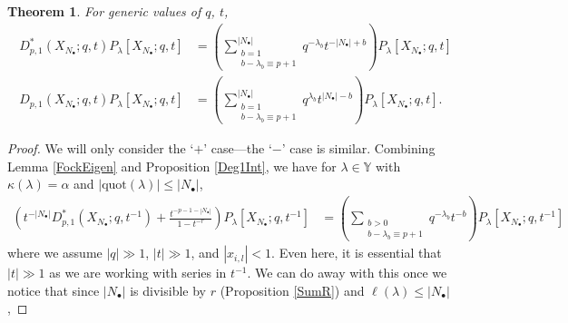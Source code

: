 \documentclass{amsart}
\newcommand{\kb}{\kappa}
\newtheorem{thm}{Theorem}
\theoremstyle{remark}
\numberwithin{thm}{section}
\numberwithin{equation}{section}
\begin{document}
\begin{thm}\label{Deg1Thm}
For generic values of $q$, $t$,
\begin{align}
\label{EigenF1}D_{p,1}^*\left( X_{N_\bullet};q,t \right)P_\lambda[X_{N_\bullet};q,t]
&=\left(\sum_{\substack{b=1\\ b-\lambda_b\equiv p+1}}^{|N_\bullet|}
q^{-\lambda_b}t^{-|N_\bullet|+b}\right)
P_\lambda[X_{N_\bullet};q,t]\\
\label{EigenE1}D_{p,1}\left( X_{N_\bullet};q,t \right)P_\lambda[X_{N_\bullet};q,t]
&=\left(\sum_{\substack{b=1\\ b-\lambda_b\equiv p+1}}^{|N_\bullet|}
q^{\lambda_b}t^{|N_\bullet|-b}\right)
P_\lambda[X_{N_\bullet};q,t].
\end{align}
\end{thm}
\begin{proof}
%
We will only consider the `$+$' case---the `$-$' case is similar.
Combining Lemma \ref{FockEigen} and Proposition \ref{Deg1Int}, we have for $\lambda\in\mathbb{Y}$ with $\kb(\lambda)=\alpha$ and $|\mathrm{quot}(\lambda)|\le |N_\bullet|$,
\begin{align*}
\left(t^{-|N_\bullet|}D_{p,1}^*(X_{N_\bullet};q,t^{-1})+\frac{t^{-p-1-|N_\bullet|}}{1-t^{-r}}\right)P_\lambda\left[ X_{N_\bullet}; q,t^{-1} \right]
&= 
\left(\sum_{\substack{b>0\\ b-\lambda_b\equiv p+1}}
q^{-\lambda_b}t^{-b}\right)
P_\lambda[X_{N_\bullet}; q,t^{-1}] 
\end{align*}
where we assume $|q|\gg 1$, $|t|\gg 1$, and $|x_{i,l}|<1$.
Even here, it is essential that $|t|\gg 1$ as we are working with series in $t^{-1}$.
We can do away with this once we notice that since $|N_\bullet|$ is divisible by $r$ (Proposition \ref{SumR}) and $\ell(\lambda)\le |N_\bullet|$,

\end{proof}
\end{document}

